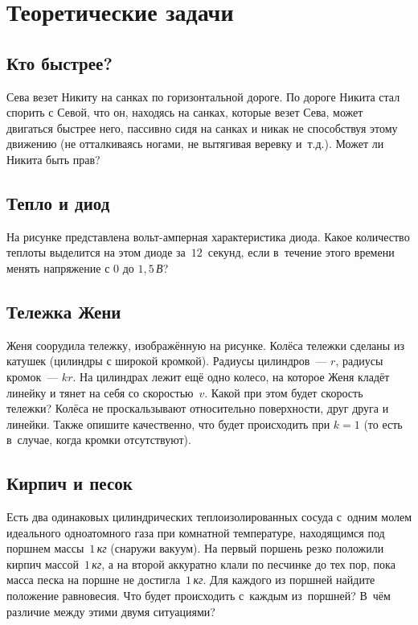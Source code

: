 \documentclass[a4paper,12pt]{article}
\newcommand\un[1]{\,\emph{#1}}
\begin{document}
\section{Теоретические задачи}

\subsection{Кто быстрее?}
Сева везет Никиту на санках по горизонтальной дороге. По дороге Никита стал спорить с Севой,
что он, находясь на санках, которые везет Сева, может двигаться быстрее него, пассивно сидя
на санках и никак не способствуя этому движению (не отталкиваясь ногами, не вытягивая веревку
и~т.д.). Может ли Никита быть прав?

\subsection{Тепло и диод} На рисунке представлена вольт-амперная характеристика диода.
Какое количество теплоты выделится на этом диоде за~$12$~секунд, если в~течение этого
времени менять напряжение с $0$ до $ 1,5$\un{В}?



\subsection{Тележка Жени}
Женя соорудила тележку, изображённую на рисунке. Колёса тележки сделаны из катушек
(цилиндры с широкой кромкой). Радиусы цилиндров~--- $r$, радиусы кромок~--- $kr$.
На цилиндрах лежит ещё одно колесо, на которое Женя кладёт линейку и тянет на себя
со скоростью~$v$. Какой при этом будет скорость тележки? Колёса не проскальзывают
относительно поверхности, друг друга и линейки. Также опишите качественно,
что будет происходить при $k = 1$ (то есть в~случае, когда кромки отсутствуют).



\subsection{Кирпич и песок}
Есть два одинаковых цилиндрических теплоизолированных сосуда с~одним молем идеального одноатомного газа
при комнатной температуре, находящимся под поршнем массы~$1$\un{кг} (снаружи вакуум). На первый поршень
резко положили кирпич массой~$1$\un{кг}, а на второй аккуратно клали по песчинке до тех пор, пока масса
песка на поршне не достигла~$1$\un{кг}. Для каждого из поршней найдите положение равновесия. Что будет
происходить с~каждым из~поршней? В~чём различие между этими двумя ситуациями?
\end{document}
